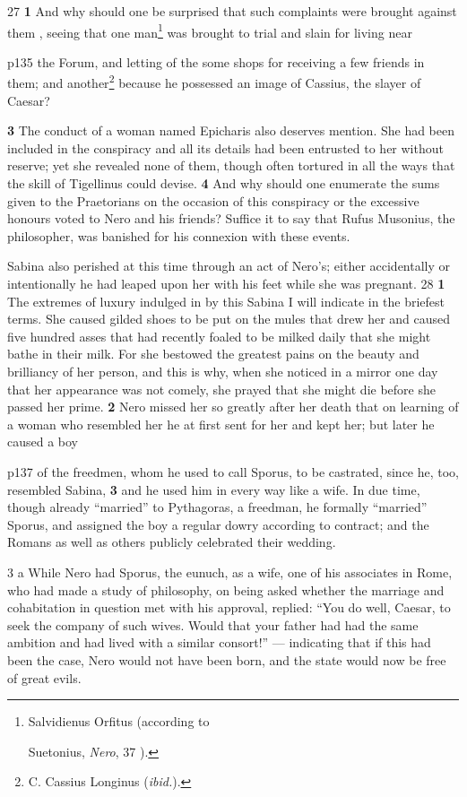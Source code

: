 27
\textbf{1} And why should one be surprised that such complaints were brought against them , seeing that one man\texthebrew{⁠}\footnote{Salvidienus Orfitus (according to

Suetonius, \emph{Nero}, 37 ).

} was brought to trial and slain for living near

p135 the Forum, and letting of the some shops for receiving a few friends in them; and another\texthebrew{⁠}\footnote{C. Cassius Longinus (\emph{ibid.}).

} because he possessed an image of Cassius, the slayer of Caesar?

\textbf{3} The conduct of a woman named Epicharis also deserves mention. She had been included in the conspiracy and all its details had been entrusted to her without reserve; yet she revealed none of them, though often tortured in all the ways that the skill of Tigellinus could devise. \textbf{4} And why should one enumerate the sums given to the Praetorians on the occasion of this conspiracy or the excessive honours voted to Nero and his friends? Suffice it to say that Rufus Musonius, the philosopher, was banished for his connexion with these events.

Sabina also perished at this time through an act of Nero's; either accidentally or intentionally he had leaped upon her with his feet while she was pregnant.
28
\textbf{1} The extremes of luxury indulged in by this Sabina I will indicate in the briefest terms. She caused gilded shoes to be put on the mules that drew her and caused five hundred asses that had recently foaled to be milked daily that she might bathe in their milk. For she bestowed the greatest pains on the beauty and brilliancy of her person, and this is why, when she noticed in a mirror one day that her appearance was not comely, she prayed that she might die before she passed her prime. \textbf{2} Nero missed her so greatly after her death that on learning of a woman who resembled her he at first sent for her and kept her; but later he caused a boy

p137 of the freedmen, whom he used to call Sporus, to be castrated, since he, too, resembled Sabina, \textbf{3} and he used him in every way like a wife. In due time, though already ``married'' to Pythagoras, a freedman, he formally ``married'' Sporus, and assigned the boy a regular dowry according to contract; and the Romans as well as others publicly celebrated their wedding.

3 a While Nero had Sporus, the eunuch, as a wife, one of his associates in Rome, who had made a study of philosophy, on being asked whether the marriage and cohabitation in question met with his approval, replied: ``You do well, Caesar, to seek the company of such wives. Would that your father had had the same ambition and had lived with a similar consort!'' \texthebrew{—} indicating that if this had been the case, Nero would not have been born, and the state would now be free of great evils.

